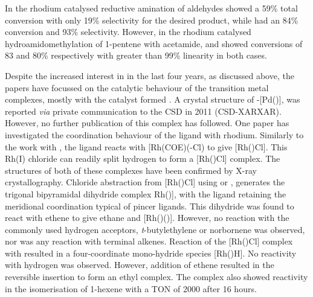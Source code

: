 In the rhodium catalysed reductive amination of aldehydes \tBuxantphos{} showed a 59\% total conversion with only 19\% selectivity for the desired product, while \Phxantphos{} had an 84\% conversion and 93\% selectivity.\cite{Raoufmoghaddam2013} However, in the rhodium catalysed hydroamidomethylation of 1-pentene with acetamide, \Phxantphos{} and \tBuxantphos{} showed conversions of 83 and 80\% respectively with greater than 99\% linearity in both cases.\cite{Raoufmoghaddam2013b}  

Despite the increased interest in \tBuxantphos{} in the last four years, as discussed above, the papers have focussed on the catalytic behaviour of the transition metal complexes, mostly with the catalyst formed .  A crystal structure of \trans-[Pd(\tBuxantphos)], was reported \emph{via} private communication to the \gls{CSD} in 2011 (CSD-XARXAR).\cite{Allen2002}  However, no further publication of this complex has followed.  One paper has investigated the coordination behaviour of the \tBuxantphos{} ligand with rhodium.\cite{Haibach2013}  Similarly to the work with \iPrxantphos{}, the \tBuxantphos{} ligand reacts with [Rh(COE)(\hapto{}-Cl)\ce{]2} to give [Rh(\tBuxantphosk)Cl].  This Rh(I) chloride can readily split hydrogen to form a [Rh(\tBuxantphosk)Cl] complex.  The structures of both of these complexes have been confirmed by X-ray crystallography.  Chloride abstraction from [Rh(\tBuxantphosk)Cl] using  or , generates the trigonal bipyramidal dihydride complex Rh(\tBuxantphosk)], with the \tBuxantphos{} ligand retaining the meridional coordination typical of pincer ligands.  This dihydride was found to react with ethene to give ethane and [Rh(\tBuxantphosk)()].  However, no reaction with the commonly used hydrogen acceptors, \emph{t}-butylethylene or norbornene was observed, nor was any reaction with terminal alkenes.  Reaction of the [Rh(\tBuxantphosk)Cl] complex with  resulted in a four-coordinate mono-hydride species [Rh(\tBuxantphos)H].  No reactivity with hydrogen was observed.  However, addition of ethene resulted in the reversible insertion to form an ethyl complex.  The complex also showed reactivity in the isomerisation of 1-hexene with a \gls{TON} of 2000 after 16 hours.  

